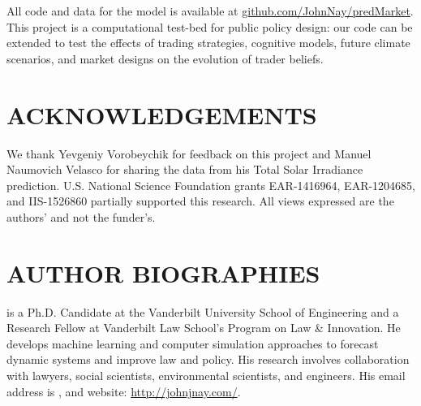 \documentclass{wscpaperproc}\usepackage[]{graphicx}\usepackage[]{color}
\begin{document}
All code and data for the model is available at \href{https://github.com/JohnNay/predMarket}{github.com/JohnNay/predMarket}. This project is a computational test-bed for public policy design: our code can be extended to test the effects of trading strategies, cognitive models, future climate scenarios, and market designs on the evolution of trader beliefs.

\section*{ACKNOWLEDGEMENTS}

We thank Yevgeniy Vorobeychik for feedback on this project and Manuel Naumovich Velasco for sharing the data from his Total Solar Irradiance prediction.
U.S. National Science Foundation grants EAR-1416964, EAR-1204685, and IIS-1526860 partially supported this research.
All views expressed are the authors' and not the funder's.




\section*{AUTHOR BIOGRAPHIES}

 is a Ph.D. Candidate at the Vanderbilt University School of Engineering and a Research Fellow at Vanderbilt Law School's Program on Law \& Innovation. He develops machine learning and computer simulation approaches to forecast dynamic systems and improve law and policy. His research involves collaboration with lawyers, social scientists, environmental scientists, and engineers. His email address is , and website: \href{http://johnjnay.com/}{http://johnjnay.com/}.\\
\end{document}
